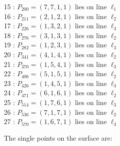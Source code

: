\documentclass{article}
\begin{document}
{\begin{multicols}{2}
15 : $P_{200}=( 7, 7, 1, 1 )$ lies on line $\ell_{1}$\\
16 : $P_{211}=( 2, 1, 2, 1 )$ lies on line $\ell_{2}$\\
17 : $P_{226}=( 1, 3, 2, 1 )$ lies on line $\ell_{3}$\\
18 : $P_{276}=( 3, 1, 3, 1 )$ lies on line $\ell_{2}$\\
19 : $P_{282}=( 1, 2, 3, 1 )$ lies on line $\ell_{3}$\\
20 : $P_{341}=( 4, 1, 4, 1 )$ lies on line $\ell_{2}$\\
21 : $P_{370}=( 1, 5, 4, 1 )$ lies on line $\ell_{3}$\\
22 : $P_{406}=( 5, 1, 5, 1 )$ lies on line $\ell_{2}$\\
23 : $P_{426}=( 1, 4, 5, 1 )$ lies on line $\ell_{3}$\\
24 : $P_{471}=( 6, 1, 6, 1 )$ lies on line $\ell_{2}$\\
25 : $P_{514}=( 1, 7, 6, 1 )$ lies on line $\ell_{3}$\\
26 : $P_{536}=( 7, 1, 7, 1 )$ lies on line $\ell_{2}$\\
27 : $P_{570}=( 1, 6, 7, 1 )$ lies on line $\ell_{3}$\\
\end{multicols}
The single points on the surface are:\\
}
\end{document}
